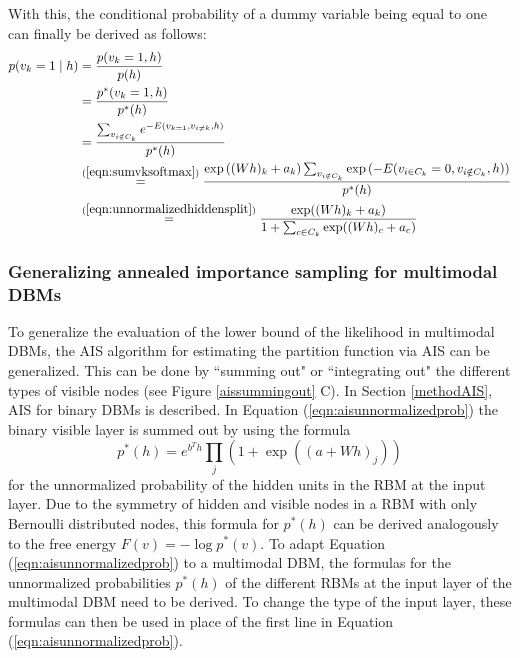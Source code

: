 \documentclass[12pt]{article}
\begin{document}
With this, the conditional probability of a dummy variable being equal to one can finally be derived as follows:
\begin{align*}
p(v_k = 1 \mid h) &= \frac{p(v_k = 1, h)}{p(h)} \\
  &= \frac{p^*(v_k = 1, h)}{p^*(h)}\\
  &= \frac{\sum_{v_{i \notin C_k}} e^{-E(v_{k=1}, v_{i \neq k}, h)}}{p^*(h)} \\
 &\stackrel{(\ref{eqn:sumvksoftmax})}{=} \frac{\exp \left( (Wh)_k + a_k \right) \sum_{v_{i \notin C_k}} \exp \left(-E(v_{i \in C_k} = 0, v_{i \notin C_k}, h) \right)}{p^*(h)}\\
&\stackrel{(\ref{eqn:unnormalizedhiddensplit})}{=} \frac{\exp((Wh)_k + a_k)}{1 + \sum_{c \in C_k} \exp ((Wh)_c + a_c)}
\end{align*}

\subsubsection{Generalizing annealed importance sampling for multimodal DBMs} \label{unnormalizedprobsrbm}

To generalize the evaluation of the lower bound of the likelihood in multimodal DBMs, the AIS algorithm for estimating the partition function via AIS can be generalized.
This can be done by ``summing out" or ``integrating out" the different types of visible nodes (see Figure \ref{aissummingout} C).
In Section \ref{methodAIS}, AIS for binary DBMs is described.
In Equation (\ref{eqn:aisunnormalizedprob}) the binary visible layer is summed out by using the formula
\[
p^*(h) = e^{b^T h} \prod_j (1+ \exp((a + W h)_j))
\]
for the unnormalized probability of the hidden units in the RBM at the input layer.
Due to the symmetry of hidden and visible nodes in a RBM with only Bernoulli distributed nodes, this formula for $p^*(h)$ can be derived analogously to the free energy $F(v) = - \log p^*(v)$.
To adapt Equation (\ref{eqn:aisunnormalizedprob}) to a multimodal DBM, the formulas for the unnormalized probabilities $p^*(h)$ of the different RBMs at the input layer of the multimodal DBM need to be derived.
To change the type of the input layer, these formulas can then be used in place of the first line in Equation (\ref{eqn:aisunnormalizedprob}).
\end{document}
